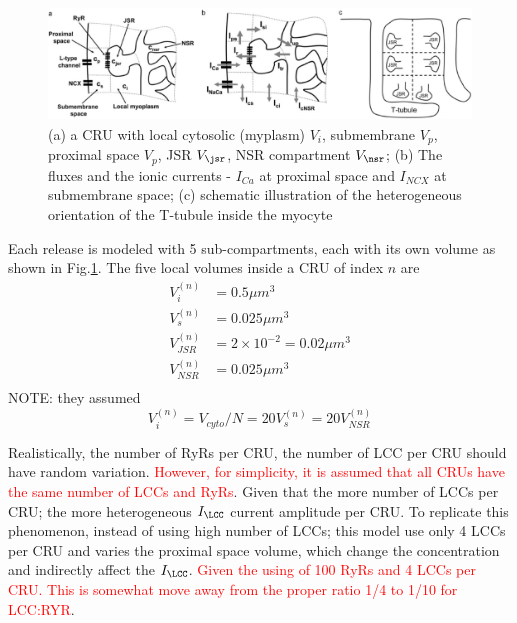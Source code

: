 \begin{figure}[hbt]
  \centerline{\includegraphics[height=3cm,
    angle=0]{./images/restrepo_CRU.eps}}
  \caption{(a) a CRU with local cytosolic (myplasm) $V_i$, submembrane $V_p$,
    proximal space $V_p$, JSR $V_\jsr$, NSR compartment $V_\nsr$; (b) The fluxes
    and the ionic currents - $I_{Ca}$ at proximal space and $I_{NCX}$ at submembrane
    space; (c) schematic illustration of the heterogeneous orientation
  of the T-tubule inside the myocyte}
\label{fig:restrepo_CRU}
\end{figure}

Each release is modeled with 5 sub-compartments, each with its own volume as
shown in Fig.\ref{fig:restrepo_CRU}. The five local volumes inside a CRU
of index $n$ are
\begin{equation}
  \label{eq:871}
  \begin{split}
    V_i^{(n)} &= 0.5\mu m^3 \\
    V_s^{(n)} &= 0.025\mu m^3 \\
    V_{JSR}^{(n)} &= 2\times 10^{-2} = 0.02\mu m^3 \\
    V_{NSR}^{(n)} &= 0.025\mu m^3 \\
  \end{split}
\end{equation}
NOTE: they assumed
\begin{equation}
  \label{eq:872}
  V_i^{(n)} = V_{cyto}/N = 20 V_s^{(n)} = 20V_{NSR}^{(n)}
\end{equation}


Realistically, the number of RyRs per CRU, the number of LCC per CRU should have
random variation. \textcolor{red}{However, for simplicity, it is assumed that
all CRUs have the same number of LCCs and RyRs}.
Given that the more number of LCCs per CRU; the more heterogeneous $I_\LCC$
current amplitude per CRU. To replicate this phenomenon, instead of using high
number of LCCs; this model use only 4 LCCs per CRU and varies the proximal space
volume, which change the  concentration and indirectly affect the
$I_\LCC$. \textcolor{red}{Given the using of 100 RyRs and 4 LCCs per CRU. This
is somewhat move away from the proper ratio 1/4 to 1/10 for LCC:RYR}.

